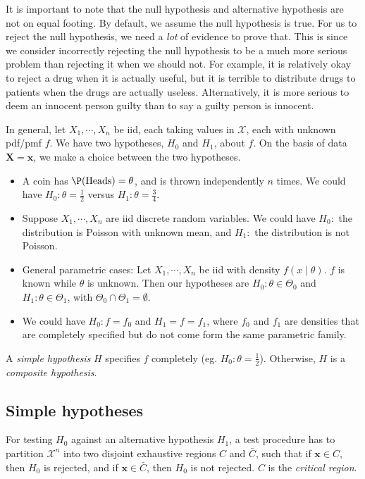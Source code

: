 \documentclass[a4paper]{article}
\begin{document}
It is important to note that the null hypothesis and alternative hypothesis are not on equal footing. By default, we assume the null hypothesis is true. For us to reject the null hypothesis, we need a \emph{lot} of evidence to prove that. This is since we consider incorrectly rejecting the null hypothesis to be a much more serious problem than rejecting it when we should not. For example, it is relatively okay to reject a drug when it is actually useful, but it is terrible to distribute drugs to patients when the drugs are actually useless. Alternatively, it is more serious to deem an innocent person guilty than to say a guilty person is innocent.

In general, let $X_1, \cdots, X_n$ be iid, each taking values in $\mathcal{X}$, each with unknown pdf/pmf $f$. We have two hypotheses, $H_0$ and $H_1$, about $f$. On the basis of data $\mathbf{X} = \mathbf{x}$, we make a choice between the two hypotheses.

\begin{eg}\leavevmode
  \begin{itemize}
    \item A coin has $\P(\text{Heads}) = \theta$, and is thrown independently $n$ times. We could have $H_0:\theta = \frac{1}{2}$ versus $H_1: \theta = \frac{3}{4}.$
    \item Suppose $X_1, \cdots, X_n$ are iid discrete random variables. We could have $H_0:$ the distribution is Poisson with unknown mean, and $H_1:$ the distribution is not Poisson.
    \item General parametric cases: Let $X_1, \cdots , X_n$ be iid with density $f(x\mid \theta)$. $f$ is known while $\theta$ is unknown. Then our hypotheses are $H_0: \theta\in \Theta_0$ and $H_1:\theta\in \Theta_1$, with $\Theta_0\cap \Theta_1 = \emptyset$.
    \item We could have $H_0: f = f_0$ and $H_1 = f = f_1$, where $f_0$ and $f_1$ are densities that are completely specified but do not come form the same parametric family.
  \end{itemize}
\end{eg}

\begin{defi}
  A \emph{simple hypothesis} $H$ specifies $f$ completely (eg. $H_0: \theta = \frac{1}{2}$). Otherwise, $H$ is a \emph{composite hypothesis}.
\end{defi}

\subsection{Simple hypotheses}
\begin{defi}
  For testing $H_0$ against an alternative hypothesis $H_1$, a test procedure has to partition $\mathcal{X}^n$ into two disjoint exhaustive regions $C$ and $\bar C$, such that if $\mathbf{x}\in C$, then $H_0$ is rejected, and if $\mathbf{x}\in \bar C$, then $H_0$ is not rejected. $C$ is the \emph{critical region}.
\end{defi}
\end{document}
